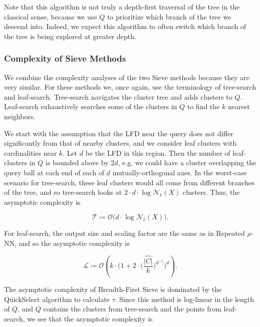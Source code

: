 Note that this algorithm is not truly a depth-first traversal of the tree in the classical sense, because we use $Q$ to prioritize which branch of the tree we descend into.
Indeed, we expect this algorithm to often switch which branch of the tree is being explored at greater depth.


\subsubsection{Complexity of Sieve Methods}
\label{sec:methods:knn-search:complexity-of-sieve-methods}

We combine the complexity analyses of the two Sieve methods because they are very similar.
For these methods we, once again, use the terminology of tree-search and leaf-search.
Tree-search navigates the cluster tree and adds clusters to $Q$.
Leaf-search exhaustively searches some of the clusters in $Q$ to find the $k$ nearest neighbors.

We start with the assumption that the LFD near the query does not differ significantly from that of nearby clusters, and we consider leaf clusters with cardinalities near $k$.
Let $d$ be the LFD in this region.
Then the number of leaf-clusters in $Q$ is bounded above by $2d$, e.g. we could have a cluster overlapping the query ball at each end of each of $d$ mutually-orthogonal axes.
In the worst-case scenario for tree-search, these leaf clusters would all come from different branches of the tree, and so tree-search looks at $2 \cdot d \cdot \log \mathcal{N}_{\hat{r}}(X)$ clusters.
Thus, the asymptotic complexity is

\begin{equation*}
    \mathcal{T} \coloneqq \mathcal{O} \big( d \cdot \log \mathcal{N}_{\hat{r}}(X) \big).
\end{equation*}

For leaf-search, the output size and scaling factor are the same as in Repeated $\rho$-NN, and so the asymptotic complexity is

\begin{equation*}
    \mathcal{L} \coloneqq \mathcal{O} \left( k \cdot \bigg( 1 + 2 \cdot \Big( \frac{\hat{|C|}}{k} \Big) ^ {d^{-1}} \bigg)^d \right).
\end{equation*}

The asymptotic complexity of Breadth-First Sieve is dominated by the QuickSelect algorithm to calculate $\tau$.
Since this method is log-linear in the length of $Q$, and $Q$ contains the clusters from tree-search and the points from leaf-search, we see that the asymptotic complexity is

